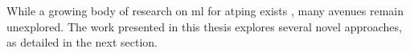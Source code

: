 While a growing body of research on \gls{ml} for \gls{atping} exists \cite{DBLP:conf/birthday/BlaauwbroekCGJK24},
many avenues remain unexplored.
The work presented in this thesis explores several novel approaches, as detailed in the next section.



%


